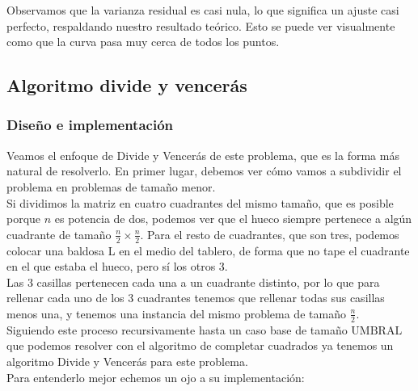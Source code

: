 \documentclass{article}
\begin{document}
    Observamos que la varianza residual es casi nula, lo que significa un ajuste
    casi perfecto, respaldando nuestro resultado teórico. Esto se puede ver
    visualmente como que la curva pasa muy cerca de todos los puntos.

\subsection{Algoritmo divide y vencerás} 

\subsubsection{Diseño e implementación} %


    
    Veamos el enfoque de Divide y Vencerás de este problema, que es la 
    forma más natural de resolverlo. En primer lugar,
    debemos ver cómo vamos a subdividir el problema en problemas de tamaño menor. \\ 
    
    Si dividimos la matriz en cuatro cuadrantes del mismo tamaño, que es posible porque $n$ es potencia de dos, podemos ver que el hueco siempre pertenece a algún cuadrante de tamaño $\frac{n}{2} \times \frac{n}{2}$. Para el resto de cuadrantes, que son tres, podemos colocar una baldosa L en el medio del tablero, de forma que no tape el cuadrante en el que estaba el hueco,
    pero sí los otros 3. \\
    
    Las 3 casillas pertenecen cada una a un cuadrante distinto, por lo
    que para rellenar cada uno de los 3 cuadrantes tenemos que rellenar todas
    sus casillas menos una, y tenemos una instancia del mismo problema de
    tamaño $\frac{n}{2}$. \\

    Siguiendo este proceso recursivamente hasta un caso base de tamaño
    $\text{UMBRAL}$ que podemos resolver con el algoritmo de completar cuadrados
    ya tenemos un algoritmo Divide y Vencerás para este problema. \\

    Para entenderlo mejor echemos un ojo a su implementación: \\

    
\end{document}
